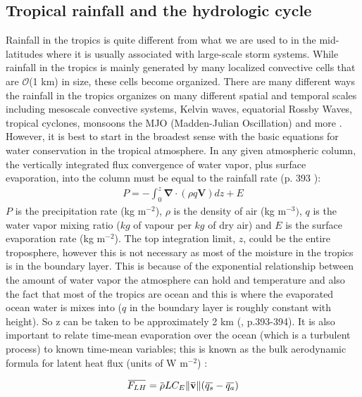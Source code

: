 \documentclass[letterpaper,12pt,titlepage,oneside,final]{book}
\newcommand{\norm}[1]{\lVert#1\rVert}
\newcommand{\overbar}[1]{\mkern 1.5mu\overline{\mkern-1.5mu#1\mkern-1.5mu}\mkern 1.5mu}
\begin{document}
\subsection{Tropical rainfall and the hydrologic cycle}\label{hydro}
Rainfall in the tropics is quite different from what we are used to in the mid-latitudes where it is usually associated with large-scale storm systems. While rainfall in the tropics is mainly generated by many localized convective cells that are $\mathcal{O}$(1 km) in size, these cells become organized. There are many different ways the rainfall in the tropics organizes on many different spatial and temporal scales including mesoscale convective systems, Kelvin waves, equatorial Rossby Waves, tropical cyclones, monsoons the MJO (Madden-Julian Oscillation) and more \citep{holton_introduction_2004}. However, it is best to start in the broadest sense with the basic equations for water conservation in the tropical atmosphere. In any given atmospheric column, the vertically integrated flux convergence of water vapor, plus surface evaporation, into the column must be equal to the rainfall rate (p. 393 \citep{holton_introduction_2004}):
\begin{align}
P=-\int_{0}^{z}\mathbf{\nabla}\cdot(\rho{q}\mathbf{V})dz+E
\end{align}
$P$ is the precipitation rate (kg m$^{-2}$), $\rho$ is the density of air (kg m$^{-3})$, $q$ is the water vapor mixing ratio ($kg$ of vapour per $kg$ of dry air) and $E$ is the surface evaporation rate (kg m$^{-2}$). The top integration limit, $z$, could be the entire troposphere, however this is not necessary as most of the moisture in the tropics is in the boundary layer. This is because of the exponential relationship between the amount of water vapor the atmosphere can hold and temperature and also the fact that most of the tropics are ocean and this is where the evaporated ocean water is mixes into ($q$ in the boundary layer is roughly constant with height). So z can be taken to be approximately 2 km (\citep{holton_introduction_2004}, p.393-394). It is also important to relate time-mean evaporation over the ocean (which is a turbulent process) to known time-mean variables; this is known as the bulk aerodynamic formula for latent heat flux (units of W m$^{-2}$) \citep{katsaros_evaporation_2001}:

\begin{align}
\overbar{F_{LH}}=\overbar{\rho}{L}C_{E}\norm{\overbar{\textbf{v}}}(\overbar{q_{s}}-\overbar{q_{a}})
\end{align}
\end{document}
